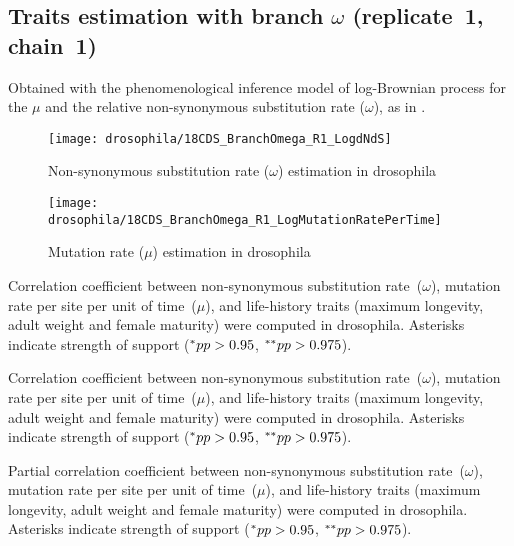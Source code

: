 \subsection{Traits estimation with branch \texorpdfstring{$\omega$}{ω} (replicate~1, chain~1)}
Obtained with the phenomenological inference model of log-Brownian process for the $\mu$ and the relative non-synonymous substitution rate ($\omega$), as in \citet{Lartillot2011}.

\begin{figure}[H]
    \centering
    \texttt{[image: drosophila/18CDS\_BranchOmega\_R1\_LogdNdS]}
    \caption[Non-synonymous substitution rate estimation in drosophila]{Non-synonymous substitution rate ($\omega$) estimation in drosophila}
\end{figure}

\begin{figure}[H]
    \centering
    \texttt{[image: drosophila/18CDS\_BranchOmega\_R1\_LogMutationRatePerTime]}
    \caption[Mutation rate estimation in drosophila]{Mutation rate ($\mu$) estimation in drosophila}
\end{figure}


\begin{table}[H]
    
    \caption[Correlation coefficient matrix in drosophila ($\omega$)]{
    Correlation coefficient between non-synonymous substitution rate~($\omega$), mutation rate per site per unit of time~($\mu$), and life-history traits (maximum longevity, adult weight and female maturity) were computed in drosophila.
    Asterisks indicate strength of support ($\smash{^{*}} pp > 0.95$, $\smash{^{**}} pp > 0.975$).}
\end{table}

\begin{table}[H]
    
    \caption[Covariance matrix in drosophila ($\omega$)]{
    Correlation coefficient between non-synonymous substitution rate~($\omega$), mutation rate per site per unit of time~($\mu$), and life-history traits (maximum longevity, adult weight and female maturity) were computed in drosophila.
    Asterisks indicate strength of support ($\smash{^{*}} pp > 0.95$, $\smash{^{**}} pp > 0.975$).}
\end{table}

\begin{table}[H]
    
    \caption[Partial correlation coefficient matrix in drosophila ($\omega$)]{
    Partial correlation coefficient between non-synonymous substitution rate~($\omega$), mutation rate per site per unit of time~($\mu$), and life-history traits (maximum longevity, adult weight and female maturity) were computed in drosophila.
    Asterisks indicate strength of support ($\smash{^{*}} pp > 0.95$, $\smash{^{**}} pp > 0.975$).}
\end{table}



